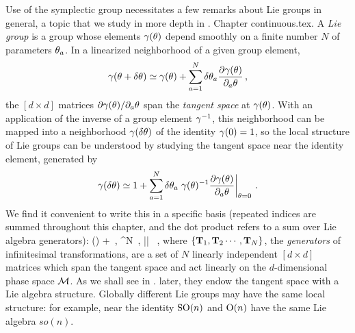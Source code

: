 %
Use of the symplectic group necessitates a few remarks about
Lie groups in general, a topic that we study in more depth in
	   \ifdasbuch
{}.
		\else
Chapter continuous.tex.
		\fi
A \emph{Lie group} is a group whose elements $\gamma(\theta)$ depend smoothly
on a finite number $N$ of parameters $\theta_a$. In a linearized neighborhood
of a given group element,
\[
\gamma(\theta+\delta\theta) \simeq \gamma(\theta)
+  \sum_{a=1}^N  \delta\theta_a
	\frac{\partial \gamma(\theta)}{\partial_a \theta}
\,,
\]
the $[d\!\times\!d]$ matrices
\(
{\partial \gamma(\theta)}/{\partial_a \theta}
\)
span the \emph{tangent space} at $\gamma(\theta)$. With an application
of the inverse of a group element $\gamma^{-1}$, this neighborhood can be
mapped into a neighborhood $\gamma(\delta\theta)$ of the identity
$\gamma(0)=1$, so the local structure of Lie groups can be understood by
studying the tangent space near the identity element, generated by
\[
\gamma(\delta\theta) \simeq 1
+ \sum_{a=1}^N \delta\theta_a \left.
	\gamma(\theta)^{-1}
	\frac{\partial \gamma(\theta)}{\partial_a \theta}
		\right|_{\theta=0}
\,.
\]
We find it convenient to write this in a specific basis
(repeated indices are summed throughout this
chapter, and the dot product refers to a sum over
Lie algebra generators):
\beq
\LieEl(\delta\gSpace)  + \delta \gSpace \cdot \Lg
    \,,\quad
\delta\gSpace \in \reals^N
    \,,\quad
|\delta \gSpace| 
    \, ,
where $\{\mathbf{T}_1,\mathbf{T}_2\cdots,\mathbf{T}_N\}$, the {\em generators} of
infinitesimal transformations, are a set of $N$ linearly independent
$[d\!\times\!d]$ matrices which span the tangent space and act linearly
on the $d$-dim\-ens\-ion\-al phase space ${\cal M}$. As we shall see
	   \ifdasbuch
in .
		\else
later,
		\fi
they endow the tangent space with a Lie algebra structure. Globally
different Lie groups may have the same local structure: for example, near
the identity $\textrm{SO}(n)$ and $\textrm{O}(n)$ have the same Lie algebra $so(n)$.

